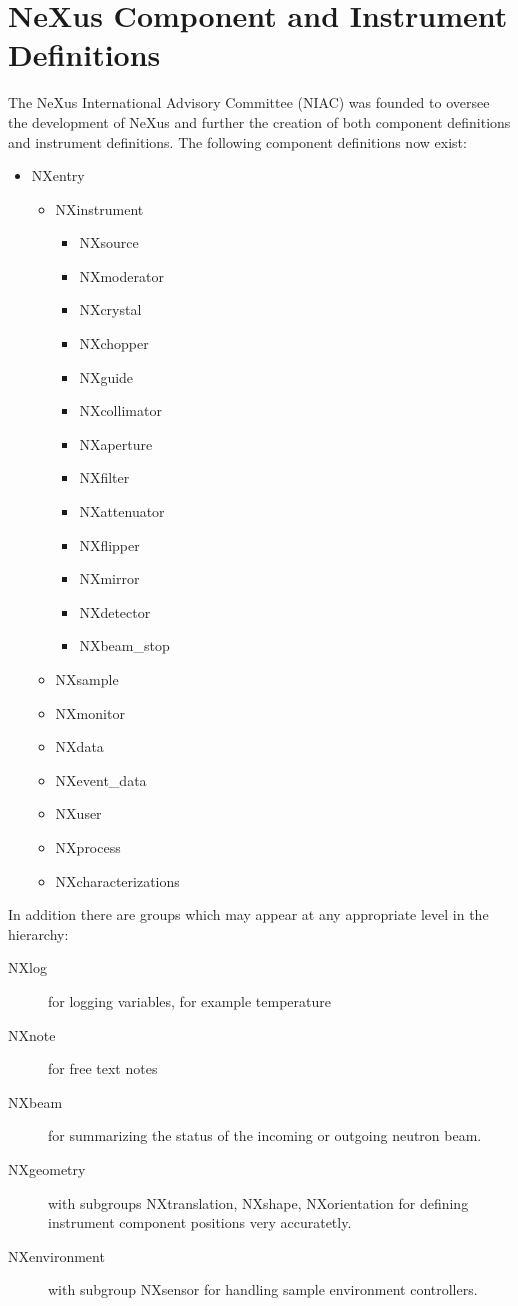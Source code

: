 \section{NeXus Component and Instrument Definitions}
The NeXus International Advisory Committee (NIAC) was founded to oversee
the development of NeXus and further the creation of both component
definitions and instrument definitions. The following component
definitions now exist: 
\begin{itemize}
\item NXentry
\begin{itemize}
\item NXinstrument
\begin{itemize}
\item NXsource
\item NXmoderator
\item NXcrystal
\item NXchopper
\item NXguide
\item NXcollimator
\item NXaperture
\item NXfilter
\item NXattenuator
\item NXflipper
\item NXmirror
\item NXdetector
\item NXbeam\_stop
\end{itemize}
\item NXsample
\item NXmonitor
\item NXdata
\item NXevent\_data
\item NXuser
\item NXprocess
\item NXcharacterizations
\end{itemize}
\end{itemize}
In addition there are groups which may appear at any appropriate level
in the hierarchy:
\begin{description}
\item[NXlog] for logging variables, for example temperature 
\item[NXnote] for free text notes 
\item[NXbeam] for summarizing the status of the incoming or outgoing 
 neutron beam. 
\item[NXgeometry] with subgroups NXtranslation,
NXshape, NXorientation for defining instrument component positions
very accuratetly. 
\item[NXenvironment] with subgroup NXsensor for handling sample 
 environment controllers.
\end{description} 


